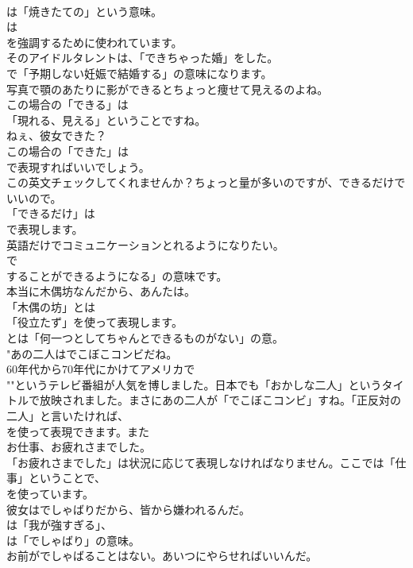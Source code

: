 \documentclass[8pt]{extreport}
\begin{document}
\begin{CJK}{UTF8}{min}
\\	は「焼きたての」という意味。
\\	は 
\\	を強調するために使われています。	
\\	そのアイドルタレントは、「できちゃった婚」をした。 
\\	で「予期しない妊娠で結婚する」の意味になります。	
\\	写真で顎のあたりに影ができるとちょっと痩せて見えるのよね。 
\\	この場合の「できる」は
\\	「現れる、見える」ということですね。	
\\	ねぇ、彼女できた？ 
\\	この場合の「できた」は 
\\	で表現すればいいでしょう。	
\\	この英文チェックしてくれませんか？ちょっと量が多いのですが、できるだけでいいので。 
\\	「できるだけ」は
\\	で表現します。	
\\	英語だけでコミュニケーションとれるようになりたい。 
\\	で
\\	することができるようになる」の意味です。	
\\	本当に木偶坊なんだから、あんたは。 
\\	「木偶の坊」とは
\\	「役立たず」を使って表現します。
\\	とは「何一つとしてちゃんとできるものがない」の意。	
\\	"あの二人はでこぼこコンビだね。 
\\	60年代から70年代にかけてアメリカで
\\	""というテレビ番組が人気を博しました。日本でも「おかしな二人」というタイトルで放映されました。まさにあの二人が「でこぼこコンビ」すね。「正反対の二人」と言いたければ、
\\	を使って表現できます。また
\\	お仕事、お疲れさまでした。 
\\	「お疲れさまでした」は状況に応じて表現しなければなりません。ここでは「仕事」ということで、
\\	を使っています。	
\\	彼女はでしゃばりだから、皆から嫌われるんだ。 
\\	は「我が強すぎる」、
\\	は「でしゃばり」の意味。	
\\	お前がでしゃばることはない。あいつにやらせればいいんだ。 

\end{CJK}
\end{document}
